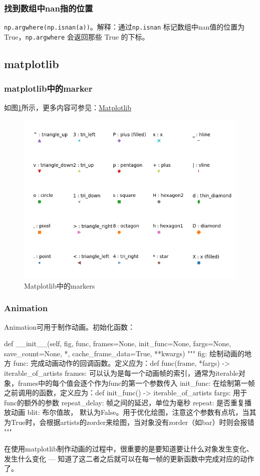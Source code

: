 \subsubsection{找到数组中nan指的位置}
\texttt{np.argwhere(np.isnan(a))}。解释：通过\texttt{np.isnan} 标记数组中nan值的位置为True，\texttt{np.argwhere} 会返回那些 True 的下标。


\subsection{matplotlib}
\subsubsection{matplotlib中的marker}如图\ref{fig:matplotlib-markers}所示，更多内容可参见：\href{https://matplotlib.org/api/_as_gen/matplotlib.pyplot.plot.html#matplotlib.pyplot.plot}{Matplotlib}
\begin{figure}[h]
	\centering
	\includegraphics[width=.65\textwidth]{pics/markers.png}
	\caption{Matplotlib中的markers}
	\label{fig:matplotlib-markers}
\end{figure}

\subsubsection{Animation}
Animation可用于制作动画。初始化函数：
\begin{python}
	def __init__(self, fig, func, frames=None, init_func=None, fargs=None,
	save_count=None, *, cache_frame_data=True, **kwargs)
	"""
	fig: 绘制动画的地方
	func: 完成动画动作的回调函数。定义应为：def func(frame, *fargs) -> iterable_of_artists
	frames: 可以认为是每一个动画帧的索引，通常为iterable对象，frames中的每个值会逐个作为func的第一个参数传入
	init_func: 在绘制第一帧之前调用的函数，定义应为：def init_func() -> iterable_of_artists
	fargs: 用于func的额外的参数
	repeat_delay: 帧之间的延迟，单位为毫秒
	repeat: 是否重复播放动画
	blit: 布尔值故， 默认为False。用于优化绘图，注意这个参数有点坑，当其为True时，会根据artists的zorder来绘图，当对象没有zorder（如bar）时则会报错
	"""
\end{python}
在使用matplotlib制作动画的过程中，很重要的是要知道要让什么对象发生变化、发生什么变化 --- 知道了这二者之后就可以在每一帧的更新函数中完成对应的动作了。

